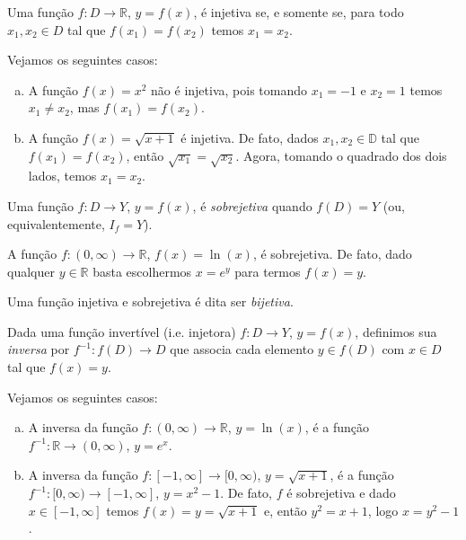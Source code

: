 \begin{obs}
  Uma função $f:D\to\mathbb{R}$, $y=f(x)$, é injetiva se, e somente se, para todo $x_1, x_2\in D$ tal que $f(x_1)=f(x_2)$ temos $x_1=x_2$.
\end{obs}

\begin{ex}
  Vejamos os seguintes casos:
  \begin{enumerate}[a)]
  \item A função $f(x) = x^2$ não é injetiva, pois tomando $x_1=-1$ e $x_2=1$ temos $x_1\neq x_2$, mas $f(x_1)=f(x_2)$.
  \item A função $f(x) = \sqrt{x+1}$ é injetiva. De fato, dados $x_1, x_2\in\mathbb{D}$ tal que $f(x_1)=f(x_2)$, então $\sqrt{x_1} = \sqrt{x_2}$. Agora, tomando o quadrado dos dois lados, temos $x_1 = x_2$.
  \end{enumerate}
\end{ex}

\begin{defn}
  Uma função $f:D\to Y$, $y=f(x)$, é \emph{sobrejetiva} quando $f(D) = Y$ (ou, equivalentemente, $I_f = Y$).
\end{defn}

\begin{ex}
  A função $f:(0, \infty)\to\mathbb{R}$, $f(x) = \ln(x)$, é sobrejetiva. De fato, dado qualquer $y\in\mathbb{R}$ basta escolhermos $x = e^y$ para termos $f(x) = y$.
\end{ex}

\begin{obs}
  Uma função injetiva e sobrejetiva é dita ser \emph{bijetiva}.
\end{obs}

\begin{defn}
  Dada uma função invertível (i.e. injetora) $f:D\to Y$, $y=f(x)$, definimos sua \emph{inversa} por $f^{-1}:f(D)\to D$ que associa cada elemento $y\in f(D)$ com $x\in D$ tal que $f(x) = y$. 
\end{defn}

\begin{ex}
  Vejamos os seguintes casos:
  \begin{enumerate}[a)]
  \item A inversa da função $f:(0, \infty)\to \mathbb{R}$, $y = \ln(x)$, é a função $f^{-1}:\mathbb{R}\to (0, \infty)$, $y = e^{x}$.
  \item A inversa da função $f:[-1, \infty]\to [0, \infty)$, $y = \sqrt{x+1}$, é a função $f^{-1}:[0, \infty)\to [-1, \infty]$, $y = x^2 -1$. De fato, $f$ é sobrejetiva e dado $x\in [-1, \infty]$ temos $f(x) = y = \sqrt{x+1}$ e, então $y^2 = x + 1$, logo $x = y^2 - 1$.
  \end{enumerate}
\end{ex}

